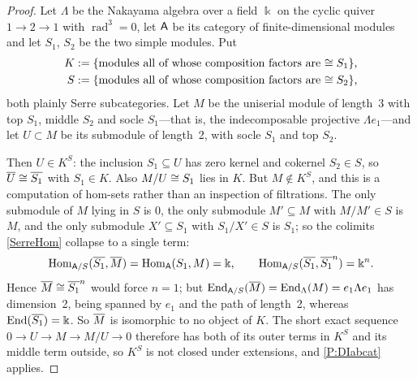 \begin{proof}
  Let \(\Lambda\) be the Nakayama algebra over a field \(\Bbbk\) on the cyclic quiver \(1\to2\to1\) with \(\operatorname{rad}^{3}=0\), let \(\mathsf{A}\) be its category of finite-dimensional modules and let \(S_{1}\), \(S_{2}\) be the two simple modules. Put
	\begin{align*}
		K & \mathrel{:=}\{\text{modules all of whose composition factors are \(\cong S_{1}\)}\}\text{,} \\
		S & \mathrel{:=}\{\text{modules all of whose composition factors are \(\cong S_{2}\)}\}\text{,}
	\end{align*}
	both plainly Serre subcategories. Let \(M\) be the uniserial module of length~3 with top \(S_{1}\), middle \(S_{2}\) and socle \(S_{1}\)---that is, the indecomposable projective \(\Lambda e_{1}\)---and let \(U\subset M\) be its submodule of length~2, with socle \(S_{1}\) and top \(S_{2}\).

	Then \(U\in K^{S}\): the inclusion \(S_{1}\subseteq U\) has zero kernel and cokernel \(S_{2}\in S\), so \(\overline{U}\cong\overline{S_{1}}\) with \(S_{1}\in K\). Also \(M/U\cong S_{1}\) lies in \(K\). But \(M\notin K^{S}\), and this is a computation of hom-sets rather than an inspection of filtrations. The only submodule of \(M\) lying in \(S\) is \(0\), the only submodule \(M'\subseteq M\) with \(M/M'\in S\) is \(M\), and the only submodule \(X'\subseteq S_{1}\) with \(S_{1}/X'\in S\) is \(S_{1}\); so the colimits \eqref{SerreHom} collapse to a single term:
	\[
		\operatorname{Hom}_{\mathsf{A}/S}(\overline{S_{1}},\overline{M})=\operatorname{Hom}_{\mathsf{A}}(S_{1},M)=\Bbbk\text{,}\qquad\operatorname{Hom}_{\mathsf{A}/S}(\overline{S_{1}},\overline{S_{1}}^{n})=\Bbbk^{n}\text{.}
	\]
	Hence \(\overline{M}\cong\overline{S_{1}}^{n}\) would force \(n=1\); but \(\operatorname{End}_{\mathsf{A}/S}(\overline{M})=\operatorname{End}_{\Lambda}(M)=e_{1}\Lambda e_{1}\) has dimension~2, being spanned by \(e_{1}\) and the path of length~2, whereas \(\operatorname{End}(\overline{S_{1}})=\Bbbk\). So \(\overline{M}\) is isomorphic to no object of \(K\). The short exact sequence \(0\to U\to M\to M/U\to 0\) therefore has both of its outer terms in \(K^{S}\) and its middle term outside, so \(K^{S}\) is not closed under extensions, and \prox\ref{P:DIabcat} applies.
\end{proof}

